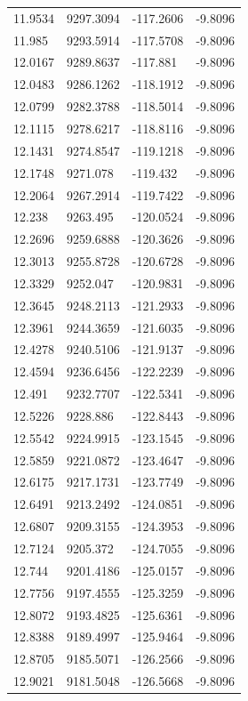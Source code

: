 \begin{table}[H]
\begin{tabular}{llll}
11.9534 & 9297.3094 & -117.2606 & -9.8096 \\
11.985 & 9293.5914 & -117.5708 & -9.8096 \\
12.0167 & 9289.8637 & -117.881 & -9.8096 \\
12.0483 & 9286.1262 & -118.1912 & -9.8096 \\
12.0799 & 9282.3788 & -118.5014 & -9.8096 \\
12.1115 & 9278.6217 & -118.8116 & -9.8096 \\
12.1431 & 9274.8547 & -119.1218 & -9.8096 \\
12.1748 & 9271.078 & -119.432 & -9.8096 \\
12.2064 & 9267.2914 & -119.7422 & -9.8096 \\
12.238 & 9263.495 & -120.0524 & -9.8096 \\
12.2696 & 9259.6888 & -120.3626 & -9.8096 \\
12.3013 & 9255.8728 & -120.6728 & -9.8096 \\
12.3329 & 9252.047 & -120.9831 & -9.8096 \\
12.3645 & 9248.2113 & -121.2933 & -9.8096 \\
12.3961 & 9244.3659 & -121.6035 & -9.8096 \\
12.4278 & 9240.5106 & -121.9137 & -9.8096 \\
12.4594 & 9236.6456 & -122.2239 & -9.8096 \\
12.491 & 9232.7707 & -122.5341 & -9.8096 \\
12.5226 & 9228.886 & -122.8443 & -9.8096 \\
12.5542 & 9224.9915 & -123.1545 & -9.8096 \\
12.5859 & 9221.0872 & -123.4647 & -9.8096 \\
12.6175 & 9217.1731 & -123.7749 & -9.8096 \\
12.6491 & 9213.2492 & -124.0851 & -9.8096 \\
12.6807 & 9209.3155 & -124.3953 & -9.8096 \\
12.7124 & 9205.372 & -124.7055 & -9.8096 \\
12.744 & 9201.4186 & -125.0157 & -9.8096 \\
12.7756 & 9197.4555 & -125.3259 & -9.8096 \\
12.8072 & 9193.4825 & -125.6361 & -9.8096 \\
12.8388 & 9189.4997 & -125.9464 & -9.8096 \\
12.8705 & 9185.5071 & -126.2566 & -9.8096 \\
12.9021 & 9181.5048 & -126.5668 & -9.8096 \\

\end{tabular}
\end{table}
